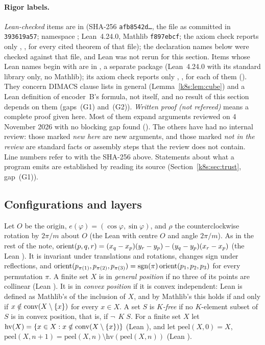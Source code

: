 \paragraph{Rigor labels.} \emph{Lean-checked} items are in  (SHA-256
\texttt{afb8542d\dots}, the file as committed in \texttt{393619a57}; namespace ;
Lean~4.24.0, Mathlib \texttt{f897ebcf}; the axiom check  reports only ,
,  for every cited theorem of that file); the declaration names below were
checked against that file, and Lean was not rerun for this section. Items whose Lean names begin with  are in , a separate
package (Lean~4.24.0 with its standard library only, no Mathlib); its axiom check reports only ,
,  for each of them (). They concern DIMACS
clause lists in general (Lemma~\ref{k8s:lem:cube}) and a Lean definition of encoder~B's formula, not
 itself, and no result of this section depends on them
(gaps~(G1) and~(G2)). \emph{Written proof (not refereed)} means a
complete proof given here. Most of them expand arguments reviewed on 4 November 2026 with no blocking gap found
(). The others have had no internal review: those marked \emph{new here} are new
arguments, and those marked \emph{not in the review} are standard facts or assembly steps that the review does not
contain. Line numbers refer to  with the SHA-256 above. Statements about what a program emits are
established by reading its source (Section~\ref{k8s:sec:trust}, gap~(G1)).

\subsection{Configurations and layers}\label{k8s:sec:setting}

Let $O$ be the origin, $e(\varphi)=(\cos\varphi,\sin\varphi)$, and $\rho$ the counterclockwise rotation by $2\pi/m$
about $O$ (the Lean  with centre $O$ and angle $2\pi/m$). As in the rest of the note,
$\operatorname{orient}(p,q,r)=(x_q-x_p)(y_r-y_p)-(y_q-y_p)(x_r-x_p)$ (the Lean ). It is invariant under translations
and rotations, changes sign under reflections, and $\operatorname{orient}(p_{\pi(1)},p_{\pi(2)},p_{\pi(3)})=\operatorname{sgn}(\pi)\operatorname{orient}(p_1,p_2,p_3)$
for every permutation $\pi$. A finite set $X$ is in \emph{general position} if no three of its points are collinear
(Lean ). It is in \emph{convex position} if it is convex independent: Lean 
is defined as Mathlib's  of the inclusion of $X$, and by Mathlib's
 this holds if and only if $x\notin\operatorname{conv}(X\setminus\{x\})$ for
every $x\in X$. A set $S$ is \emph{$K$-free} if no $K$-element subset of $S$ is in convex position, that is, if
$\neg\,$$\;K\;S$. For a finite set $X$ let $\mathrm{hv}(X)=\{x\in X: x\notin\operatorname{conv}(X\setminus\{x\})\}$
(Lean ), and let $\mathrm{peel}(X,0)=X$,
$\mathrm{peel}(X,n+1)=\mathrm{peel}(X,n)\setminus\mathrm{hv}(\mathrm{peel}(X,n))$ (Lean ).


